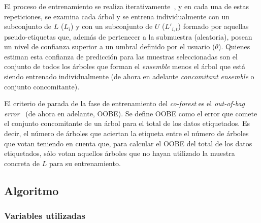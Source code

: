 El proceso de entrenamiento se realiza iterativamente~\cite{engelen2018thesis}, y en cada una de estas repeticiones, se examina cada árbol y se entrena individualmente con un subconjunto de $L$ ($L_{i}$) y con un subconjunto de $U$ ($L'_{i,t}$) formado por aquellas pseudo-etiquetas que, además de pertenecer a la submuestra (aleatoria), posean un nivel de confianza superior a un umbral definido por el usuario ($\theta$). Quienes estiman esta confianza de predicción para las muestras seleccionadas son el conjunto de todos los árboles que forman el \textit{ensemble} menos el árbol que está siendo entrenado individualmente (de ahora en adelante \textit{concomitant ensemble} o conjunto concomitante).

El criterio de parada de la fase de entrenamiento del \textit{co-forest} es el \textit{out-of-bag error}~\cite{zhou2021SemisupervisedRecommendationAttack} (de ahora en adelante, OOBE). Se define OOBE como el error que comete el conjunto concomitante de un árbol para el total de los datos etiquetados. Es decir, el número de árboles que aciertan la etiqueta entre el número de árboles que votan teniendo en cuenta que, para calcular el OOBE del total de los datos etiquetados, sólo votan aquellos árboles que no hayan utilizado la muestra concreta de $L$ para su entrenamiento.


\subsection{Algoritmo}


\subsubsection{Variables utilizadas}

